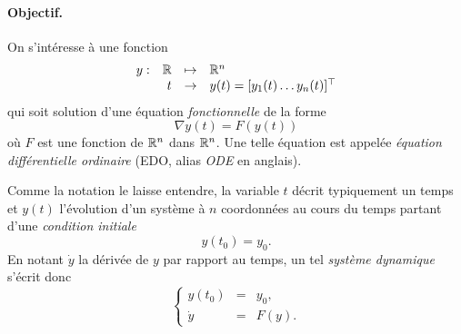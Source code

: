 

\paragraph*{Objectif.} 
On s'intéresse à une fonction 
$$
\begin{array}{rrcl}
  y : & \mathbb{R} & \mapsto & \mathbb{R}^n \\
  & t & \rightarrow & y(t) = [y_1(t) \dots y_n(t)]^\top 
\end{array}
$$
qui soit solution d'une équation {\em fonctionnelle} de la forme
$$
\nabla y(t) = F(y(t))
$$
où $F$ est une fonction de $\mathbb{R}^n$ dans $\mathbb{R}^n$. Une telle équation est appelée {\em équation différentielle ordinaire} (EDO, alias {\em ODE} en anglais).

Comme la notation le laisse entendre, la variable $t$ décrit typiquement un temps et $y(t)$ l'évolution d'un système à $n$ coordonnées au cours du temps partant d'une {\em condition initiale}
$$
y(t_0) = y_0.
$$
En notant $\dot y$ la dérivée de $y$ par rapport au temps, un tel {\em système dynamique} s'écrit donc
$$
\left\{\begin{array}{rcl}
        y(t_0) & = & y_0, \\
        \dot y & = & F(y).
       \end{array}\right.
$$


